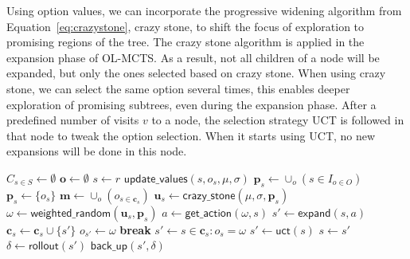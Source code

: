Using option values, we can incorporate the progressive widening algorithm from
Equation~\ref{eq:crazystone}, crazy stone, to shift the focus of exploration to
promising regions of the tree. The crazy stone algorithm is applied in the
expansion phase of OL-MCTS\@.  As a result, not all children of a node will be
expanded, but only the ones selected based on crazy stone. When using crazy
stone, we can select the same option several times, this enables deeper
exploration of promising subtrees, even during the expansion phase. After a
predefined number of visits $v$ to a node, the selection strategy UCT
is followed in that node to tweak the option selection. When it starts using
UCT, no new expansions will be done in this node.

\begin{algorithm}[h]
	\caption{$\mathsf{OL-MCTS}(O, r, t, d, v, \mu, \sigma)$}
	\label{alg:olmcts}
	\begin{algorithmic}[1]
		\State $C_{s \in S} \gets \emptyset$
		\State $\mathbf{o} \gets \emptyset$
		 \label{alg:olmcts:mainloop}
			\State $s \gets r$
			 \label{alg:olmcts:innerloop}
				 \label{alg:olmcts:sp}
					\State $\mathsf{update\_values}(s, o_s, \mu, \sigma)$
						 \label{alg:olmcts:update}
					\State $\mathbf{p}_s \gets \cup_o (s \in I_{o \in O})$
				\Else
					\State $\mathbf{p}_s \gets \{o_s\}$
				\EndIf \label{alg:olmcts:scs}
				\State $\mathbf{m} \gets \cup_o (o_{s \in \mathbf{c}_s})$
				 
					\label{alg:olmcts:ns}
					\State $\mathbf{u}_s \gets \mathsf{crazy\_stone}(\mu, \sigma, \mathbf{p}_s)$
					\State $\omega \gets \mathsf{weighted\_random}(\mathbf{u}_s, \mathbf{p}_s)$
					 
						\State $a \gets \mathsf{get\_action}(\omega, s)$ \label{alg:olmcts:scs}
						\State $s' \gets \mathsf{expand}(s, a)$ 
						\State $\mathbf{c}_s \gets \mathbf{c}_s \cup \{s'\}$
						\State $o_{s'} \gets \omega$
						\State \textbf{break} \label{alg:olmcts:ecs}
					\Else {}
						\State $s' \gets s \in \mathbf{c}_s : o_s = \omega$ \label{alg:olmcts:s} 
					\EndIf
				\Else {}
					\State $s' \gets \mathsf{uct}(s)$ \label{alg:olmcts:uct}
				\EndIf \label{alg:olmcts:ecs}
				\State $s \gets s'$ \label{alg:olmcts:ss}
			\EndWhile
			\State $\delta \gets \mathsf{rollout}(s')$ \label{alg:olmcts:rollout}
			\State $\mathsf{back\_up}(s', \delta)$ \label{alg:olmcts:backup}
		\EndWhile
		\State {}
	\end{algorithmic}
\end{algorithm}

